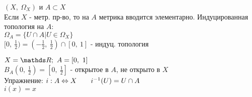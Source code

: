 \documentclass[geometry.tex]{subfiles}
\begin{document}
  \begin{example}
    $(X,\ \Omega_X)$ и $A \subset X$\\
     Если $X$ - метр. пр-во, то на $A$ метрика вводится элементарно. Индуцированная топология на $A$:\\
    $\Omega_A = \{U \cap A | U \in \Omega_X\}$\\
    $[0,\ \frac{1}{2}) = (- \frac{1}{2},\ \frac{1}{2}) \cap [0,\ 1]$ - индуц. топология
    \begin{example}
      $X = \R;\ A = [0,\ 1]$\\
      $B_A(0,\ \frac{1}{2})=[0,\ \frac{1}{2}]$ - открытое в $A$, не открыто в $X$\\
Упражнение: $i: A \Leftrightarrow X \qquad i^{-1}(U) = U \cap A$\\
$i(x) = x$
    \end{example}
  \end{example}
\end{document}
